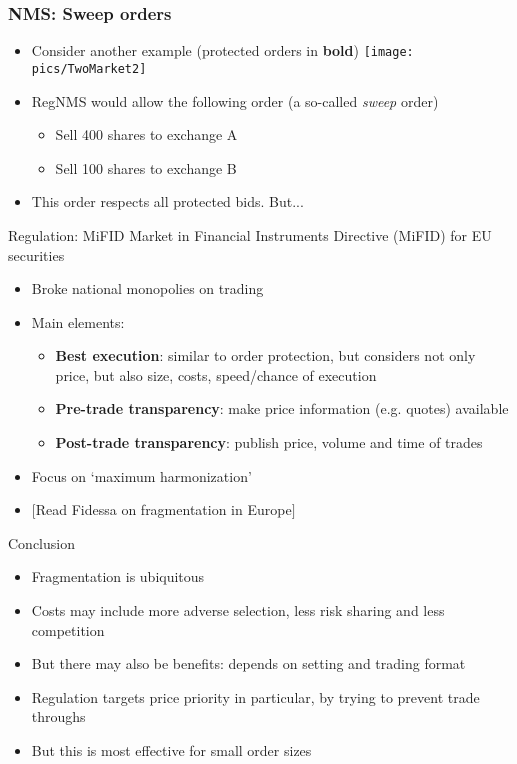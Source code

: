 \documentclass[english,10pt
,aspectratio=169
]{beamer}
\begin{document}
\begin{frame}
\frametitle{NMS: Sweep orders}
\begin{itemize}
\item Consider another example (protected orders in \textbf{bold})
\quad
\texttt{[image: pics/TwoMarket2]}
\item RegNMS would allow the following order (a so-called \textit{sweep} order)
\begin{itemize}
\item Sell 400 shares to exchange A
\item Sell 100 shares to exchange B
\end{itemize}
\item This order respects all protected bids. But...
\end{itemize}
\end{frame}


\begin{frame}{Regulation: MiFID}
Market in Financial Instruments Directive (MiFID) for EU securities
\begin{itemize}
\item Broke national monopolies on trading
\item Main elements:
\begin{itemize}
\item \textbf{Best execution}: similar to order protection, but considers not only price, but also size, costs, speed/chance of execution
\item \textbf{Pre-trade transparency}: make price information (e.g. quotes) available
\item \textbf{Post-trade transparency}: publish price, volume and time of trades
\end{itemize}
\item Focus on `maximum harmonization'
\item $[$Read Fidessa on fragmentation in Europe$]$
\end{itemize}
\end{frame}


\begin{frame}{Conclusion}
\begin{itemize}
\item Fragmentation is ubiquitous 
\item Costs may include more adverse selection, less risk sharing and less competition
\item But there may also be benefits: depends on setting and trading format
\item Regulation targets price priority in particular, by trying to prevent trade throughs
\item But this is most effective for small order sizes
\end{itemize}
\end{frame}
\end{document}
